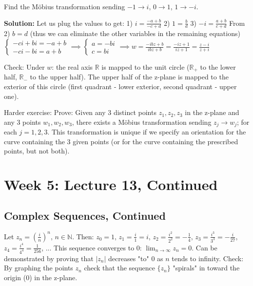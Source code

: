 \documentclass[12pt]{article}
\begin{document}
\begin{example}
Find the Möbius transformation sending $-1 \to i$, $0 \to 1$, $1 \to -i$.

\textbf{Solution:} Let us plug the values to get:
1) $i = \frac{-a+b}{-c+d}$
2) $1 = \frac{b}{d}$
3) $-i = \frac{a+b}{c+d}$
From 2) $b=d$ (thus we can eliminate the other variables in the remaining equations)
$\begin{cases} -ci+bi = -a+b \\ -ci-bi = a+b \end{cases} \implies \begin{cases} a = -bi \\ c = bi \end{cases} \implies w = \frac{-ibz+b}{ibz+b} = \frac{-iz+1}{iz+1} = \frac{z-i}{z+i}$

Check: Under $w$: the real axis $\mathbb{R}$ is mapped to the unit circle ($\mathbb{R}_+$ to the lower half, $\mathbb{R}_-$ to the upper half). The upper half of the z-plane is mapped to the exterior of this circle (first quadrant - lower exterior, second quadrant - upper one).
\end{example}

Harder exercise: Prove: Given any 3 distinct points $z_1, z_2, z_3$ in the z-plane and any 3 points $w_1, w_2, w_3$, there exists a Möbius transformation sending $z_j \to w_j$; for each $j=1,2,3$. This transformation is unique if we specify an orientation for the curve containing the 3 given points (or for the curve containing the prescribed points, but not both).

\section{Week 5: Lecture 13, Continued}

\subsection{Complex Sequences, Continued}

\begin{example}
Let $z_n = (\frac{i}{n})^n$, $n \in \mathbb{N}$. Then:
$z_0 = 1$, $z_1 = \frac{i}{1} = i$, $z_2 = \frac{i^2}{2^2} = -\frac{1}{4}$, $z_3 = \frac{i^3}{3^3} = -\frac{i}{27}$, $z_4 = \frac{i^4}{4^4} = \frac{1}{256}$, ...
This sequence converges to 0: $\lim_{n\to\infty} z_n = 0$. Can be demonstrated by proving that $|z_n|$ decreases "to" 0 as $n$ tends to infinity.
Check: By graphing the points $z_n$ check that the sequence $\{z_n\}$ "spirals" in toward the origin (0) in the z-plane.
\end{example}
\end{document}
